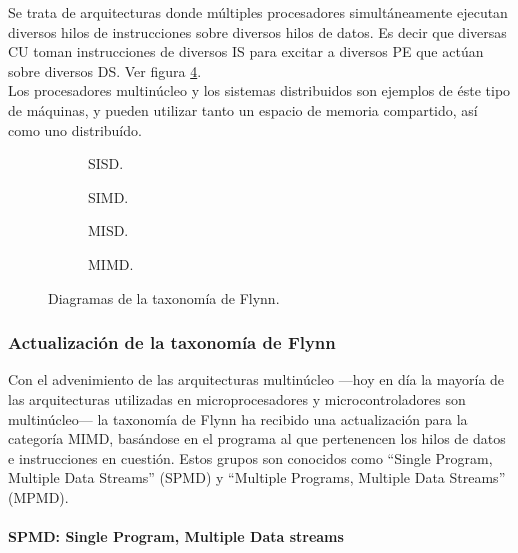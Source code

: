 Se trata de arquitecturas donde múltiples procesadores simultáneamente ejecutan 
diversos hilos de instrucciones sobre diversos hilos de datos. Es decir que 
diversas CU toman instrucciones de diversos IS para excitar a diversos PE que 
actúan sobre diversos DS. Ver figura \ref{subfig:mimd}.\\
Los procesadores multinúcleo y los sistemas distribuidos son ejemplos de éste 
tipo de máquinas, y pueden utilizar tanto un espacio de memoria compartido, así 
como uno distribuído.
\begin{figure}
  \begin{subfigure}[b]{0.5\textwidth}
    
    \caption{SISD.}
    \label{subfig:sisd}
  \end{subfigure}
  \begin{subfigure}[b]{0.5\textwidth}
    
    \caption{SIMD.}
    \label{subfig:simd}
  \end{subfigure}
  \begin{subfigure}[b]{0.5\textwidth}
    
    \caption{MISD.}
    \label{subfig:misd}
  \end{subfigure}
  \begin{subfigure}[b]{0.5\textwidth}
    
    \caption{MIMD.}
    \label{subfig:mimd}
  \end{subfigure}
  \caption{Diagramas de la taxonomía de Flynn.}
  \label{fig:flynn_taxonomy}
\end{figure}

\subsubsection{Actualización de la taxonomía de Flynn}
\label{subsubsec:theory-modern-flynn_taxonomy-today}

Con el advenimiento de las arquitecturas multinúcleo ---hoy en día la mayoría 
de las arquitecturas utilizadas en microprocesadores y microcontroladores son 
multinúcleo--- la taxonomía de Flynn ha recibido una actualización para la 
categoría MIMD, basándose en el programa al que pertenencen los hilos de datos 
e instrucciones en cuestión. Estos grupos son conocidos como ``Single Program, 
Multiple Data Streams'' (SPMD) y ``Multiple Programs, Multiple Data Streams'' 
(MPMD).

\paragraph{SPMD: Single Program, Multiple Data streams}
\label{par:theory-modern-flynn_taxonomy-today-SPMD}

